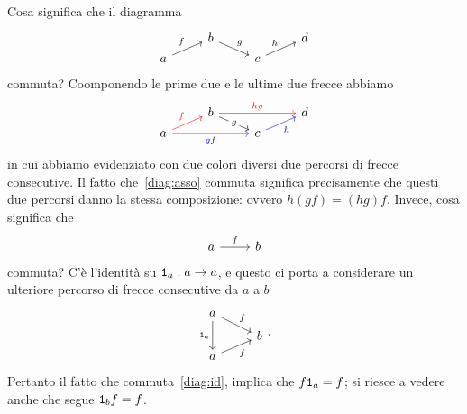 \begin{nota}
Cosa significa che il diagramma
\begin{equation}\begin{tikzcd}[row sep=tiny]
               & b \ar["g", dr] &                & d \\
a \ar["f", ur] &                & c \ar["h", ur] &
\end{tikzcd}\label{diag:asso}\end{equation}
commuta? Coomponendo le prime due e le ultime due frecce abbiamo
\[\begin{tikzcd}[row sep=tiny]
& b \ar["g"{description}, dr] \ar["hg", rr, red] & & d \\
a \ar["f", ur, red] \ar["gf", rr, blue, swap] & & c \ar["h", ur, blue, swap] &
\end{tikzcd}\]
in cui abbiamo evidenziato con due colori diversi due percorsi di frecce consecutive. Il fatto che~\eqref{diag:asso} commuta significa precisamente che questi due percorsi danno la stessa composizione: ovvero \(h(gf)=(hg)f\).\newline
Invece, cosa significa che
\begin{equation}\begin{tikzcd}
a \ar["f", r] & b
\end{tikzcd}\label{diag:id}\end{equation}
commuta? C'è l'identità su \(\mathtt{1}_a : a \to a\), e questo ci porta a considerare un ulteriore percorso di frecce consecutive da \(a\) a \(b\)
\[\begin{tikzcd}[row sep=tiny]
a \ar["f", dr] \ar["\id_a", dd, swap] &   \\
                                      & b \\
a \ar["f", ur, swap]                  & 
\end{tikzcd}.\]
Pertanto il fatto che commuta~\eqref{diag:id}, implica che \(f \mathtt{1}_a = f\); si riesce a vedere anche che segue \(\mathtt{1}_b f = f\). 
\end{nota}

